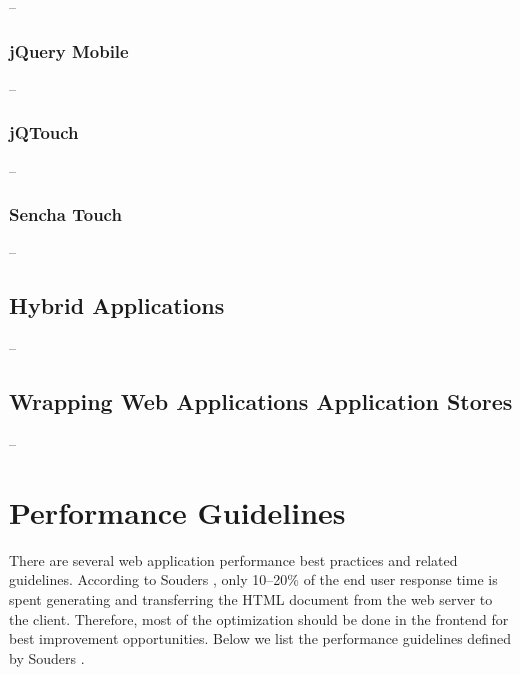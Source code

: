 --

\subsubsection{jQuery Mobile}

--

\subsubsection{jQTouch}

--

\subsubsection{Sencha Touch}

--

\subsection{Hybrid Applications}

--

\subsection{Wrapping Web Applications Application Stores}

--

\clearpage
\section{Performance Guidelines}
\label{section:performance-guidelines}

There are several web application performance best practices and
related guidelines. According to Souders \cite{souders2007high}, only
10--20\% of the end user response time is spent generating and
transferring the HTML document from the web server to the
client. Therefore, most of the optimization should be done in the
frontend for best improvement opportunities. Below we list the
performance guidelines defined by Souders \cite{souders2007high,
  souders2009even}.

